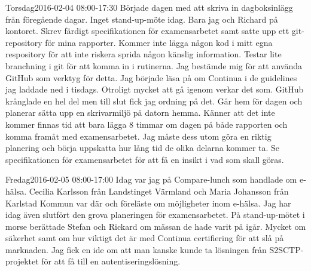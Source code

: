 \documentclass[a4paper,oneside]{book}
\begin{document}
\begin{diary}{Torsdag}{2016-02-04 08:00-17:30}
	Började dagen med att skriva in dagboksinlägg från föregående dagar. Inget stand-up-möte idag. Bara jag och Richard på kontoret. Skrev färdigt specifikationen för examensarbetet samt satte upp ett git-repository för mina rapporter. Kommer inte lägga någon kod i mitt egna respository för att inte riskera sprida någon känslig information. Testar lite branchning i git för att komma in i rutinerna. Jag bestämde mig för att använda GitHub som verktyg för detta. Jag började läsa på om Continua i de guidelines jag laddade ned i tisdags. Otroligt mycket att gå igenom verkar det som. GitHub krånglade en hel del men till slut fick jag ordning på det. Går hem för dagen och planerar sätta upp en skrivarmiljö på datorn hemma. Känner att det inte kommer finnas tid att bara lägga 8 timmar om dagen på både rapporten och komma framåt med examensarbetet. Jag måste dess utom göra en riktig planering och börja uppskatta hur lång tid de olika delarna kommer ta. Se specifikationen för examensarbetet för att få en insikt i vad som skall göras.
\end{diary}

\begin{diary}{Fredag}{2016-02-05 08:00-17:00}
	Idag var jag på Compare-lunch som handlade om e-hälsa. Cecilia Karlsson från Landstinget Värmland och Maria Johansson från Karlstad Kommun var där och föreläste om möjligheter inom e-hälsa. Jag har idag även slutfört den grova planeringen för examensarbetet. På stand-up-mötet i morse berättade Stefan och Rickard om mässan de hade varit på igår. Mycket om säkerhet samt om hur viktigt det är med Continua certifiering för att slå på marknaden. Jag fick en ide om att man kanske kunde ta lösningen från S2SCTP-projektet för att få till en autentiseringslösning.
\end{diary}
\newpage
\end{document}
